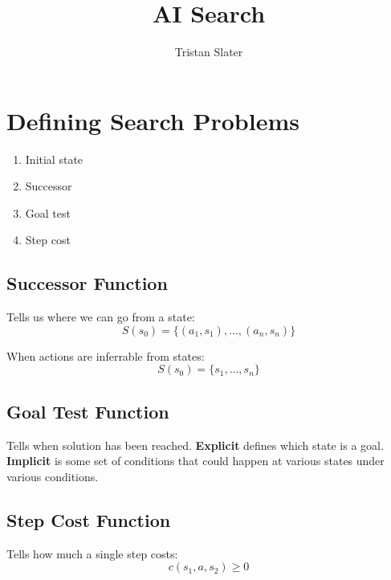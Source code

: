 \documentclass{article}
\title{AI Search}
\author{Tristan Slater}
\begin{document}
    \maketitle

    \tableofcontents

    \section{Defining Search Problems}

    \begin{enumerate}
        \item Initial state
        \item Successor
        \item Goal test
        \item Step cost
    \end{enumerate}

    \subsection{Successor Function}

    Tells us where we can go from a state: \begin{equation}
        S(s_0) = \{(a_1, s_1), ..., (a_n, s_n)\}
    \end{equation}

    When actions are inferrable from states: \begin{equation}
        S(s_0) = \{s_1, ..., s_n\}
    \end{equation}

    \subsection{Goal Test Function}

    Tells when solution has been reached. \textbf{Explicit} defines which state is a goal. \textbf{Implicit} is some set of conditions that could happen at various states under various conditions.

    \subsection{Step Cost Function}

    Tells how much a single step costs: \begin{equation}
        c(s_1, a, s_2) \geq 0
    \end{equation}
\end{document}
